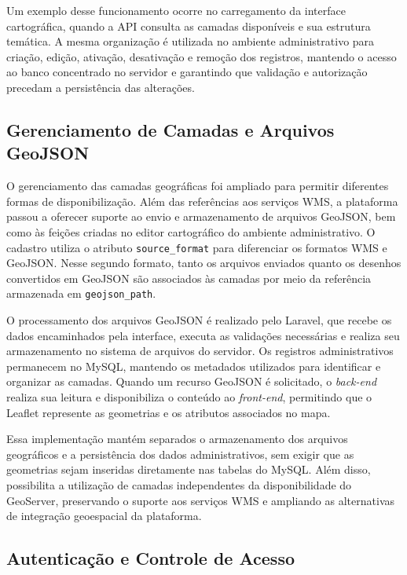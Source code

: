 Um exemplo desse funcionamento ocorre no carregamento da interface cartográfica, quando a API consulta as camadas disponíveis e sua estrutura temática. A mesma organização é utilizada no ambiente administrativo para criação, edição, ativação, desativação e remoção dos registros, mantendo o acesso ao banco concentrado no servidor e garantindo que validação e autorização precedam a persistência das alterações.

\subsection{Gerenciamento de Camadas e Arquivos GeoJSON}
\label{sec:gerenciamento-geojson}

O gerenciamento das camadas geográficas foi ampliado para permitir diferentes formas de disponibilização. Além das referências aos serviços WMS, a plataforma passou a oferecer suporte ao envio e armazenamento de arquivos GeoJSON, bem como às feições criadas no editor cartográfico do ambiente administrativo. O cadastro utiliza o atributo \texttt{source\_format} para diferenciar os formatos WMS e GeoJSON. Nesse segundo formato, tanto os arquivos enviados quanto os desenhos convertidos em GeoJSON são associados às camadas por meio da referência armazenada em \texttt{geojson\_path}.

O processamento dos arquivos GeoJSON é realizado pelo Laravel, que recebe os dados encaminhados pela interface, executa as validações necessárias e realiza seu armazenamento no sistema de arquivos do servidor. Os registros administrativos permanecem no MySQL, mantendo os metadados utilizados para identificar e organizar as camadas. Quando um recurso GeoJSON é solicitado, o \textit{back-end} realiza sua leitura e disponibiliza o conteúdo ao \textit{front-end}, permitindo que o Leaflet represente as geometrias e os atributos associados no mapa.

Essa implementação mantém separados o armazenamento dos arquivos geográficos e a persistência dos dados administrativos, sem exigir que as geometrias sejam inseridas diretamente nas tabelas do MySQL. Além disso, possibilita a utilização de camadas independentes da disponibilidade do GeoServer, preservando o suporte aos serviços WMS e ampliando as alternativas de integração geoespacial da plataforma.

\subsection{Autenticação e Controle de Acesso}
\label{sec:autenticacao-controle-acesso}

